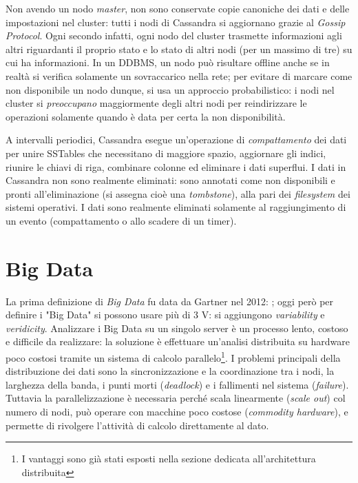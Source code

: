 \documentclass[a4page, 11pt]{article}
\begin{document}
Non avendo un nodo \textit{master}, non sono conservate copie canoniche dei dati e delle impostazioni nel cluster: tutti i nodi di Cassandra si aggiornano grazie al \textit{Gossip Protocol}.
Ogni secondo infatti, ogni nodo del cluster trasmette informazioni agli altri riguardanti il proprio stato e lo stato di altri nodi (per un massimo di tre) su cui ha informazioni.
In un DDBMS, un nodo può risultare offline anche se in realtà si verifica solamente un sovraccarico nella rete; per evitare di marcare come non disponibile un nodo dunque, si usa un approccio probabilistico: i nodi nel cluster si \textit{preoccupano} maggiormente degli altri nodi per reindirizzare le operazioni solamente quando è data per certa la non disponibilità.

A intervalli periodici, Cassandra esegue un'operazione di \textit{compattamento} dei dati per unire SSTables che necessitano di maggiore spazio, aggiornare gli indici, riunire le chiavi di riga, combinare colonne ed eliminare i dati superflui.
I dati in Cassandra non sono realmente eliminati: sono annotati come non disponibili e pronti all'eliminazione (si assegna cioè una \textit{tombstone}), alla pari dei \textit{filesystem} dei sistemi operativi.
I dati sono realmente eliminati solamente al raggiungimento di un evento (compattamento o allo scadere di un timer).


\part{Big Data}
La prima definizione di \textit{Big Data} fu data da Gartner nel 2012: \cite{Big data is high volume, high velocity and/or high variety information assets}; oggi però per definire i "Big Data" si possono usare più di 3 V: si aggiungono \textit{variability} e \textit{veridicity}.
Analizzare i Big Data su un singolo server è un processo lento, costoso e difficile da realizzare: la soluzione è effettuare un’analisi distribuita su hardware poco costosi tramite un sistema di calcolo parallelo\footnote{I vantaggi sono già stati esposti nella sezione dedicata all'architettura distribuita}.
I problemi principali della distribuzione dei dati sono la sincronizzazione e la coordinazione tra i nodi, la larghezza della banda, i punti morti (\textit{deadlock}) e i fallimenti nel sistema (\textit{failure}).
Tuttavia la parallelizzazione è necessaria perché scala linearmente (\textit{scale out}) col numero di nodi, può operare con macchine poco costose (\textit{commodity hardware}), e permette di rivolgere l'attività di calcolo direttamente al dato.
\end{document}
